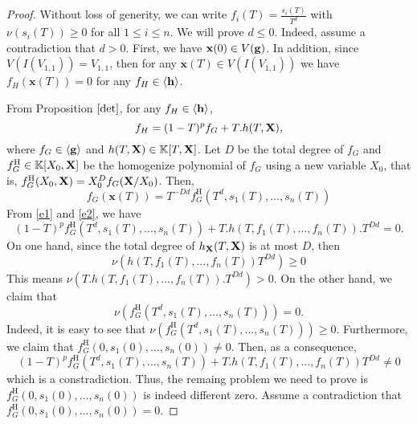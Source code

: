 \documentclass[11pt]{article}
\numberwithin{Property}{section}
\numberwithin{Theorem}{section}
\numberwithin{Proposition}{section}
\numberwithin{Lemma}{section}
\numberwithin{Corollary}{section}
\numberwithin{Definition}{section}
\numberwithin{Remark}{section}
\numberwithin{Conjecture}{section}
\numberwithin{Problem}{section}
\numberwithin{Claim}{section}
\theoremstyle{definition}
\numberwithin{Example}{section}
\renewcommand{\leq}{\leqslant}
\renewcommand{\ge}{\geqslant}
\renewcommand{\ge}{\geqslant} %
\newcommand{\field}{\mathbb{K}} %
\newcommand{\mat}[1]{\mathbf{\MakeUppercase{#1}}} %
\begin{document}
\begin{proof}
Without loss of generity, we can write $f_i(T) = \frac{s_i(T)}{T^d}$ with $\nu(s_i(T)) \ge 0$ for all $1 \leq i \leq n$. We will prove $d \leq 0$. Indeed, assume a contradiction that $d > 0$. First, we have $\mathbf{x}(0) \in V({\bf g})$. In addition, since $V(I(V_{1,1})) = V_{1,1}$, then for any $\mathbf{x}(T) \in V(I(V_{1,1}))$ we have $f_H(\mathbf{x}(T)) = 0$ for any $f_H \in \langle {\bf h} \rangle$. 

From Proposition $\ref{det}$, for any $f_H \in \langle {\bf h} \rangle$, 
\begin{equation}\label{e1}
f_H = (1-T)^p f_G + T.h(T, \mat{X}),
\end{equation}
 where $f_G \in \langle {\bf g} \rangle$ and $h(T, \mat{X}) \in \field[T, \mat{X}]$. Let $D$ be the total degree of $f_G$ and $f_G^{\mathrm{H}} \in \field[X_0, \mat{X}]$ be the homogenize polynomial of $f_G$ using a new variable $X_0$, that is, $f_G^{\mathrm{H}}(X_0, \mat{X}) = X_0^Df_G(\mat{X}/X_0)$. Then, 
 \begin{equation}\label{e2}
 f_G(\mathbf{x}(T)) = T^{-Dd}f_G^{\mathrm{H}}(T^d, s_1(T),\ldots, s_n(T)) 
 \end{equation}
From \cref{e1} and \cref{e2}, we have 
\[
(1-T)^pf_G^{\mathrm{H}}(T^d, s_1(T), \ldots, s_n(T))  + T.h(T, f_1(T), \ldots, f_n(T)).T^{Dd} = 0.
\]
On one hand, since the total degree of $h_{\mat{X}}(T, \mat{X})$ is at most $D$, then \[\nu(h(T, f_1(T), \ldots, f_n(T))T^{Dd}) \ge 0\] This means $\nu(T.h(T, f_1(T), \ldots, f_n(T)).T^{Dd}) > 0$. On the other hand, we claim that \[\nu(f_G^{\mathrm{H}}(T^d, s_1(T), \ldots, s_n(T))) = 0.\] Indeed, it is easy to see that $\nu(f_G^{\mathrm{H}}(T^d, s_1(T), \ldots, s_n(T))) \ge 0$. Furthermore, we claim that $f_G^{\mathrm{H}}(0, s_1(0), \ldots, s_n(0)) \ne 0$. Then, as a consequence,  
\[
(1-T)^pf_G^{\mathrm{H}}(T^d, s_1(T), \ldots, s_n(T))  + T.h(T, f_1(T), \ldots, f_n(T))T^{Dd} \ne 0
\]
 which is a constradiction. Thus, the remaing problem we need to prove is $f_G^{\mathrm{H}}(0, s_1(0), \ldots, s_n(0))$ is indeed different zero. Assume a contradiction that $f_G^{\mathrm{H}}(0, s_1(0), \ldots, s_n(0)) = 0$.

\end{proof}
\end{document}

